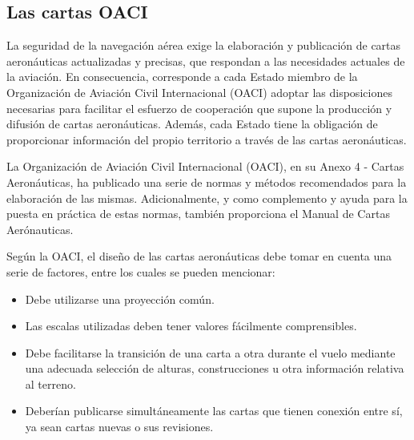 \subsection{Las cartas OACI \cite{Salazar_nav_aerea}}

La seguridad de la navegaci\'on a\'erea exige la elaboraci\'on y publicaci\'on de cartas aeron\'auticas actualizadas y precisas, que respondan a las necesidades actuales de la aviaci\'on. En consecuencia, corresponde a cada Estado miembro de la Organizaci\'on de Aviaci\'on Civil Internacional (OACI) adoptar las disposiciones necesarias para facilitar el esfuerzo de cooperaci\'on que supone la producci\'on y difusi\'on de cartas aeron\'auticas. Adem\'as, cada Estado tiene la obligaci\'on de proporcionar informaci\'on del propio territorio a trav\'es de las cartas aeron\'auticas.

La Organizaci\'on de Aviaci\'on Civil Internacional (OACI), en su Anexo 4 - Cartas Aeron\'auticas, ha publicado una serie de normas y m\'etodos recomendados para la elaboraci\'on de las mismas. Adicionalmente, y como complemento y ayuda para la puesta en pr\'actica de estas normas, tambi\'en proporciona el Manual de Cartas Aer\'onauticas.

Seg\'un la OACI, el dise\~no de las cartas aeron\'auticas debe tomar en cuenta una serie de factores, entre los cuales se pueden mencionar:

\begin{itemize}

\item  Debe utilizarse una proyecci\'on com\'un.

  \item Las escalas utilizadas deben tener valores f\'acilmente
  comprensibles.

  \item Debe facilitarse la transici\'on de una carta a otra durante el
  vuelo mediante una adecuada selecci\'on de alturas, construcciones u
  otra informaci\'on relativa al terreno.

  \item Deber\'ian publicarse simult\'aneamente las cartas que tienen conexi\'on
  entre s\'i, ya sean cartas nuevas o sus revisiones.

\end{itemize}

\begin{landscape}
  
\end{landscape}

